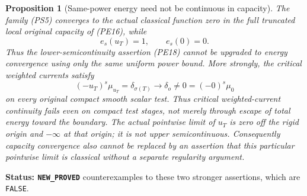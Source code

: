 \documentclass[11pt,a4paper]{article}
\numberwithin{equation}{section}
\newtheorem{proposition}[theorem]{Proposition}
\theoremstyle{definition}
\theoremstyle{remark}
\begin{document}
\begin{proposition}[Same-power energy need not be continuous in capacity]
\label{prop:r11-power-energy-continuity-failure}
The family (PS5) converges to the actual classical function zero
in the full truncated local original capacity of (PE16), while
\[
                         e_s(u_T)=1,
                         \qquad e_s(0)=0.
 \tag{PS6}
\]
Thus the lower-semicontinuity assertion (PE18) cannot be upgraded
to energy convergence using only the same uniform power bound.
More strongly, the critical weighted currents satisfy
\[
       (-u_T)^s\mu_{u_T}=\delta_{\sigma(T)}
                  \longrightarrow\delta_o
                  \ne0=(-0)^s\mu_0
 \tag{PS7}
\]
on every original compact smooth scalar test. Thus critical
weighted-current continuity fails even on compact test stages,
not merely through escape of total energy toward the boundary.
The actual pointwise limit of $u_T$ is zero off the rigid origin
and $-\infty$ at that origin; it is not upper semicontinuous.
Consequently capacity convergence also cannot be replaced by
an assertion that this particular pointwise limit is classical
without a separate regularity argument.
\end{proposition}

\noindent\textbf{Status: \texttt{NEW\_PROVED}} counterexamples
to these two stronger assertions, which are \texttt{FALSE}.
\end{document}
